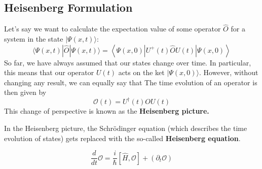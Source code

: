 \subsection{Heisenberg Formulation}
Let's say we want to calculate the expectation value of some operator $\hat{O}$ for a system in the state $|\Psi(x, t)\rangle:$
$$
\langle\Psi(x, t)|\hat{O}| \Psi(x, t)\rangle=\left\langle\Psi(x, 0)\left|U^{+}(t) \hat{O} U(t)\right| \Psi(x, 0)\right\rangle
$$
So far, we have always assumed that our states change over time. In particular, this means that our operator $U(t)$ acts on the ket $|\Psi(x, 0)\rangle .$ However, without changing any result, we can equally say that  The time evolution of an operator is then given by
\begin{equation}
\mathcal{O}(t)=U^{\dagger}(t) O U(t)
\end{equation}
This change of perspective is known as the \textbf{Heisenberg picture.}

In the Heisenberg picture, the Schrödinger equation (which describes the time evolution of states) gets replaced with the so-called \textbf{Heisenberg equation}.
\begin{qt}
\begin{equation}
\frac{d}{d t} \mathcal{O}=\frac{i}{\hbar}[\hat{H}, \mathcal{O}]+\left(\partial_{t} \mathcal{O}\right)
\end{equation}
\end{qt}